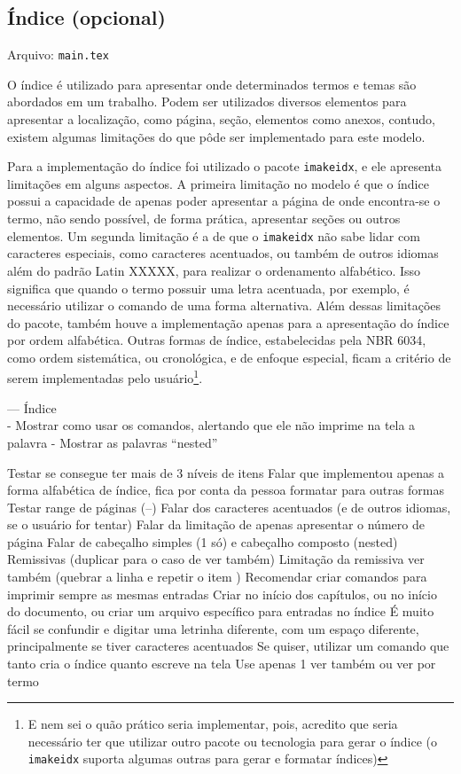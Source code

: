 \subsection{Índice (opcional)}
    Arquivo: \texttt{main.tex}

    O índice é utilizado para apresentar onde determinados termos e temas são abordados em um trabalho. Podem ser utilizados diversos elementos para apresentar a localização, como página, seção, elementos como anexos, contudo, existem algumas limitações do que pôde ser implementado para este modelo.
    
    Para a implementação do índice foi utilizado o pacote \texttt{imakeidx}, e ele apresenta limitações em alguns aspectos. A primeira limitação no modelo é que o índice possui a capacidade de apenas poder apresentar a página de onde encontra-se o termo, não sendo possível, de forma prática, apresentar seções ou outros elementos. Um segunda limitação é a de que o \texttt{imakeidx} não sabe lidar com caracteres especiais, como caracteres acentuados, ou também de outros idiomas além do padrão Latin XXXXX, para realizar o ordenamento alfabético. Isso significa que quando o termo possuir uma letra acentuada, por exemplo, é necessário utilizar o comando de uma forma alternativa. Além dessas limitações do pacote, também houve a implementação apenas para a apresentação do índice por ordem alfabética. Outras formas de índice, estabelecidas pela NBR 6034, como ordem sistemática, ou cronológica, e de enfoque especial, ficam a critério de serem implementadas pelo usuário\footnote{E nem sei o quão prático seria implementar, pois, acredito que seria necessário ter que utilizar outro pacote ou tecnologia para gerar o índice (o \texttt{imakeidx} suporta algumas outras para gerar e formatar índices)}.

--- Índice\\
    - Mostrar como usar os comandos, alertando que ele não imprime na tela a palavra
    - Mostrar as palavras ``nested''

    Testar se consegue ter mais de 3 níveis de itens
    Falar que implementou apenas a forma alfabética de índice, fica por conta da pessoa formatar para outras formas
    Testar range de páginas (--)
    Falar dos caracteres acentuados (e de outros idiomas, se o usuário for tentar)
    Falar da limitação de apenas apresentar o número de página
    Falar de cabeçalho simples (1 só) e cabeçalho composto (nested)
    Remissivas (duplicar para o caso de ver também)
        Limitação da remissiva ver também (quebrar a linha e repetir o item )
    Recomendar criar comandos para imprimir sempre as mesmas entradas
        Criar no início dos capítulos, ou no início do documento, ou criar um arquivo específico para entradas no índice
        É muito fácil se confundir e digitar uma letrinha diferente, com um espaço diferente, principalmente se tiver caracteres acentuados
    Se quiser, utilizar um comando que tanto cria o índice quanto escreve na tela
    Use apenas 1 ver também ou ver por termo

